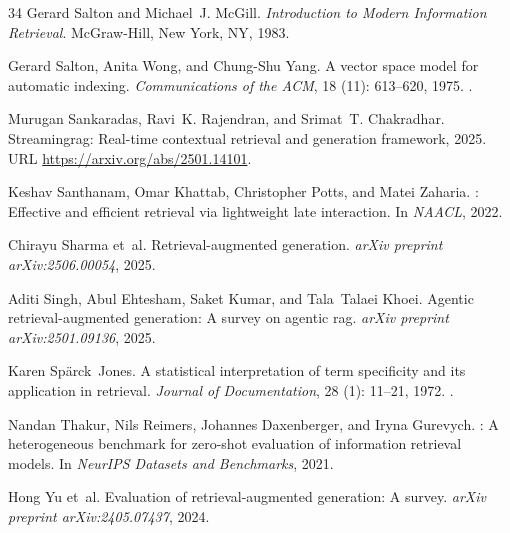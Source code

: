 \begin{thebibliography}{34}
Gerard Salton and Michael~J. McGill.
\newblock \emph{Introduction to Modern Information Retrieval}.
\newblock McGraw-Hill, New York, NY, 1983.

Gerard Salton, Anita Wong, and Chung-Shu Yang.
\newblock A vector space model for automatic indexing.
\newblock \emph{Communications of the ACM}, 18 (11): 613--620, 1975.
\newblock {}.

Murugan Sankaradas, Ravi~K. Rajendran, and Srimat~T. Chakradhar.
\newblock Streamingrag: Real-time contextual retrieval and generation framework, 2025.
\newblock URL \url{https://arxiv.org/abs/2501.14101}.

Keshav Santhanam, Omar Khattab, Christopher Potts, and Matei Zaharia.
: Effective and efficient retrieval via lightweight late interaction.
\newblock In \emph{NAACL}, 2022.

Chirayu Sharma et~al.
\newblock Retrieval-augmented generation.
\newblock \emph{arXiv preprint arXiv:2506.00054}, 2025.

Aditi Singh, Abul Ehtesham, Saket Kumar, and Tala~Talaei Khoei.
\newblock Agentic retrieval-augmented generation: A survey on agentic rag.
\newblock \emph{arXiv preprint arXiv:2501.09136}, 2025.

Karen Sp{\"a}rck~Jones.
\newblock A statistical interpretation of term specificity and its application in retrieval.
\newblock \emph{Journal of Documentation}, 28 (1): 11--21, 1972.
\newblock {}.

Nandan Thakur, Nils Reimers, Johannes Daxenberger, and Iryna Gurevych.
: A heterogeneous benchmark for zero-shot evaluation of information retrieval models.
\newblock In \emph{NeurIPS Datasets and Benchmarks}, 2021.

Hong Yu et~al.
\newblock Evaluation of retrieval-augmented generation: A survey.
\newblock \emph{arXiv preprint arXiv:2405.07437}, 2024.


\end{thebibliography}
